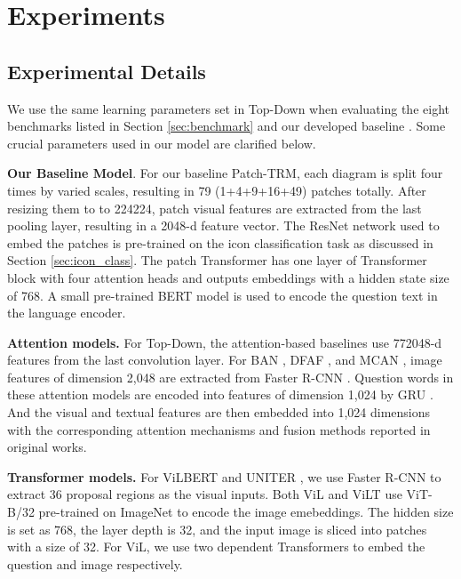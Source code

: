 \documentclass{article}
\begin{document}
\section{Experiments} 
\label{app_exp}

\subsection{Experimental Details}
\label{app_experiment_detail}

We use the same learning parameters set in Top-Down \cite{Anderson2017up} when evaluating the eight benchmarks listed in Section \ref{sec:benchmark} and our developed baseline . Some crucial parameters used in our model are clarified below. 

\textbf{Our Baseline Model}. For our baseline Patch-TRM, each diagram is split four times by varied scales, resulting in 79 (1+4+9+16+49) patches totally. After resizing them to to 224224, patch visual features are extracted from the last pooling layer, resulting in a 2048-d feature vector. The ResNet network used to embed the patches is pre-trained on the icon classification task as discussed in Section \ref{sec:icon_class}. The patch Transformer has one layer of Transformer block with four attention heads and outputs embeddings with a hidden state size of 768. A small pre-trained BERT model \cite{turc2019well} is used to encode the question text in the language encoder. 

\textbf{Attention models.} For Top-Down, the attention-based baselines use 772048-d features from the last convolution layer. For BAN \cite{Kim2018}, DFAF \cite{gao2019dynamic}, and MCAN \cite{yu2019mcan}, image features of dimension 2,048 are extracted from Faster R-CNN \cite{ren2015faster}. Question words in these attention models are encoded into features of dimension 1,024 by GRU \cite{cho2014learning}. And the visual and textual features are then embedded into 1,024 dimensions with the corresponding attention mechanisms and fusion methods reported in original works. 

\textbf{Transformer models.} For ViLBERT \cite{lu2019vilbert} and UNITER \cite{chen2020uniter}, we use Faster R-CNN \cite{ren2015faster} to extract 36 proposal regions as the visual inputs. Both ViL \cite{wonjae2021an} and ViLT \cite{pmlr-v139-kim21k} use ViT-B/32 pre-trained on ImageNet to encode the image emebeddings. The hidden size is set as 768, the layer depth is 32, and the input image is sliced into patches with a size of 32. For ViL, we use two dependent Transformers to embed the question and image respectively.
\end{document}
